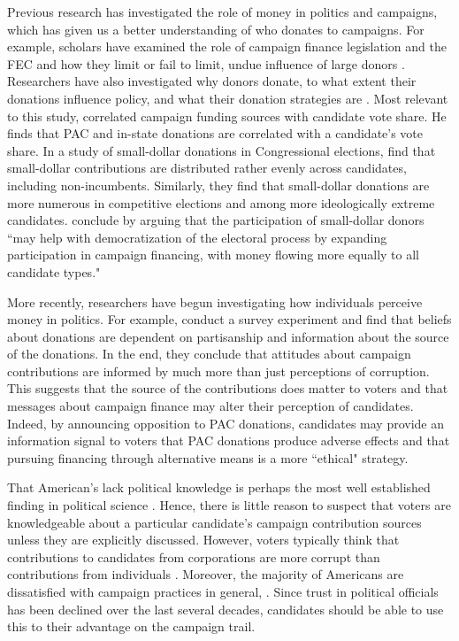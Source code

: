 \documentclass[12pt]{article}
\begin{document}
 Previous research has investigated the role of money in politics and campaigns, which has given us a better understanding of who donates to campaigns. For example, scholars have examined the role of campaign finance legislation and the FEC and how they limit or fail to limit, undue influence of large donors  \citep{magleby_money_2010, raja_small_2008}. Researchers have also investigated why donors donate, to what extent their donations influence policy, and what their donation strategies are \citep{francia_financiers_2003}. Most relevant to this study, \citet{alexander_good_2005} correlated campaign funding sources with candidate vote share. He finds that PAC and in-state donations are correlated with a candidate's vote share. In a study of small-dollar donations in Congressional elections, \citep{culberson_small_2019} find that small-dollar contributions are distributed rather evenly across candidates, including non-incumbents. Similarly, they find that small-dollar donations are more numerous in competitive elections and among more ideologically extreme candidates. \citep{culberson_small_2019} conclude by arguing that the participation of small-dollar donors ``may help with democratization of the electoral process by expanding participation in campaign financing, with money flowing more equally to all candidate types."   
 
 More recently, researchers have begun investigating how individuals perceive money in politics. For example, \citet{bowler_campaign_2016} conduct a survey experiment and find that beliefs about donations are dependent on partisanship and information about the source of the donations. In the end, they conclude that attitudes about campaign contributions are informed by much more than just perceptions of corruption. This suggests that the source of the contributions does matter to voters and that messages about campaign finance may alter their perception of candidates. Indeed, by announcing opposition to PAC donations, candidates may provide an information signal to voters that PAC donations produce adverse effects and that pursuing financing through alternative means is a more ``ethical" strategy. 
 
 That American's lack political knowledge is perhaps the most well established finding in political science \citep{page_rational_1992, carpini_what_1997}. Hence, there is little reason to suspect that voters are knowledgeable about a particular candidate's campaign contribution sources unless they are explicitly discussed. However, voters typically think that contributions to candidates from corporations are more corrupt than contributions from individuals \citep{bowler_campaign_2016}. Moreover, the majority of Americans are dissatisfied with campaign practices in general, \citep{mayer_public_2001, persily_perceptions_2004}. Since trust in political officials has been declined over the last several decades, candidates should be able to use this to their advantage on the campaign trail.
 
\end{document}
